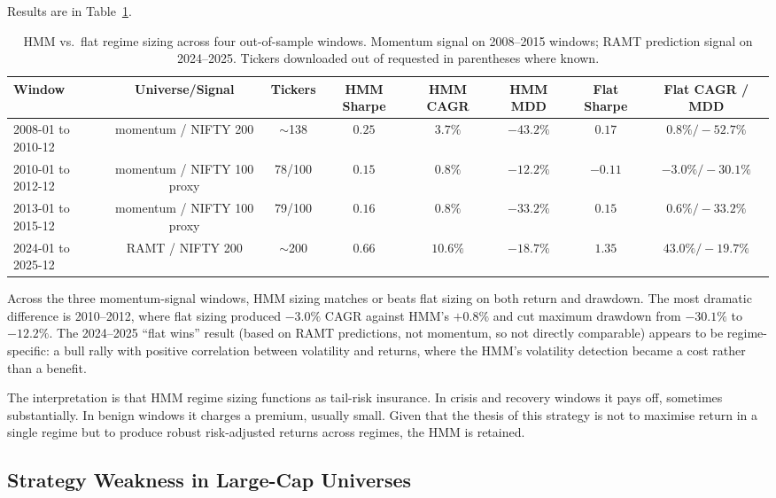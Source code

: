 \documentclass[conference]{IEEEtran}
\begin{document}
Results are in Table~\ref{tab:four-windows}.

\begin{table}[htbp]
\caption{HMM vs.\ flat regime sizing across four out-of-sample windows. Momentum signal on 2008--2015 windows; RAMT prediction signal on 2024--2025. Tickers downloaded out of requested in parentheses where known.}
\label{tab:four-windows}
\centering
\small
\begin{tabular}{lccccccc}
\toprule
\textbf{Window} & \textbf{Universe/Signal} & \textbf{Tickers} & \textbf{HMM Sharpe} & \textbf{HMM CAGR} & \textbf{HMM MDD} & \textbf{Flat Sharpe} & \textbf{Flat CAGR / MDD} \\
\midrule
2008-01 to 2010-12 & momentum / NIFTY 200 & $\sim$138 & $0.25$ & $3.7\%$ & $-43.2\%$ & $0.17$ & $0.8\% / -52.7\%$ \\
2010-01 to 2012-12 & momentum / NIFTY 100 proxy & 78/100 & $0.15$ & $0.8\%$ & $-12.2\%$ & $-0.11$ & $-3.0\% / -30.1\%$ \\
2013-01 to 2015-12 & momentum / NIFTY 100 proxy & 79/100 & $0.16$ & $0.8\%$ & $-33.2\%$ & $0.15$ & $0.6\% / -33.2\%$ \\
2024-01 to 2025-12 & RAMT / NIFTY 200 & $\sim$200 & $0.66$ & $10.6\%$ & $-18.7\%$ & $1.35$ & $43.0\% / -19.7\%$ \\
\bottomrule
\end{tabular}
\end{table}

Across the three momentum-signal windows, HMM sizing matches or beats flat sizing on both return and drawdown. The most dramatic difference is 2010--2012, where flat sizing produced $-3.0\%$ CAGR against HMM's $+0.8\%$ and cut maximum drawdown from $-30.1\%$ to $-12.2\%$. The 2024--2025 ``flat wins'' result (based on RAMT predictions, not momentum, so not directly comparable) appears to be regime-specific: a bull rally with positive correlation between volatility and returns, where the HMM's volatility detection became a cost rather than a benefit.

The interpretation is that HMM regime sizing functions as tail-risk insurance. In crisis and recovery windows it pays off, sometimes substantially. In benign windows it charges a premium, usually small. Given that the thesis of this strategy is not to maximise return in a single regime but to produce robust risk-adjusted returns across regimes, the HMM is retained.

\subsection{Strategy Weakness in Large-Cap Universes}
\end{document}

